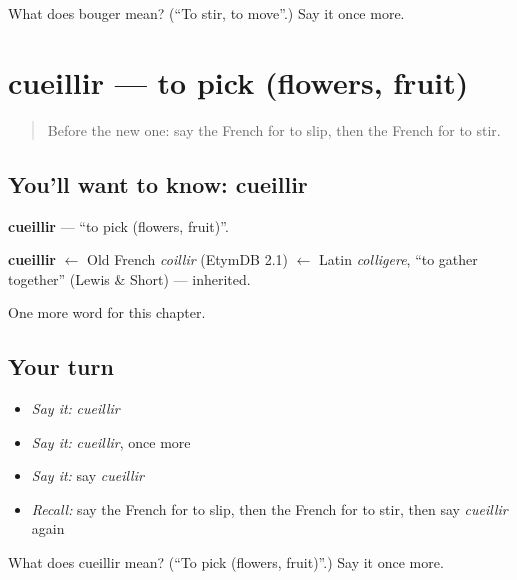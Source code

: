 \begin{tcolorbox}[breakable,colback=teal!4,colframe=teal!35!black,title={Before you move on}]
What does bouger mean? (\textquotedblleft{}To stir, to move\textquotedblright{}.) Say it once more.
\end{tcolorbox}
\section[cueillir]{cueillir — to pick (flowers, fruit)}

\label{lesson:FR-C184-cueillir}



\begin{quote}
Before the new one: say the French for to slip, then the French for to stir.
\end{quote}

\subsection*{You'll want to know: cueillir}
\textbf{cueillir} — \textquotedblleft{}to pick (flowers, fruit)\textquotedblright{}.

\begin{cousinweb}
\textbf{cueillir} $\leftarrow$ Old French \emph{coillir} (EtymDB 2.1) $\leftarrow$ Latin \emph{colligere}, \textquotedblleft{}to gather together\textquotedblright{} (Lewis \& Short) — inherited.
\end{cousinweb}

\begin{grammarlens}[title={What you've built}]
One more word for this chapter.
\end{grammarlens}

\subsection*{Your turn}
\begin{itemize}
\raggedright
  \item \emph{Say it:} \emph{cueillir}
  \item \emph{Say it:} \emph{cueillir}, once more
  \item \emph{Say it:} say \emph{cueillir}
  \item \emph{Recall:} say the French for to slip, then the French for to stir, then say \emph{cueillir} again
\end{itemize}

\begin{tcolorbox}[breakable,colback=teal!4,colframe=teal!35!black,title={Before you move on}]
What does cueillir mean? (\textquotedblleft{}To pick (flowers, fruit)\textquotedblright{}.) Say it once more.
\end{tcolorbox}
